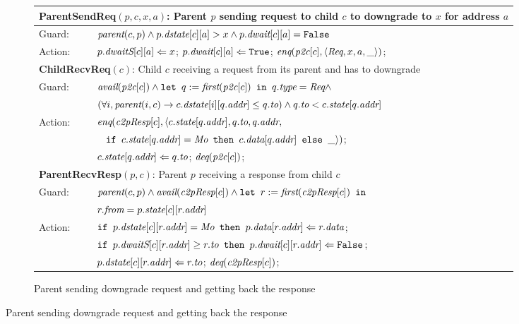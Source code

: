 \begin{figure}
\begin{subfigure}{\textwidth}
\centering
\begin{tabular}{|ll|}
\hline
\multicolumn{2}{|l|}{\textbf{ParentSendReq}$(p, c, x, a)$: Parent $p$ sending request to child $c$ to downgrade to $x$ for address $a$}\\
\hline
Guard: & $\textit{parent}(c,p) \wedge p.\textit{dstate}[c][a] > x \wedge p.\textit{dwait}[c][a] = \texttt{False}$\\
\hline
Action: & $p.\textit{dwaitS}[c][a] \Leftarrow x$; $p.\textit{dwait}[c][a] \Leftarrow \texttt{True}$; $\textit{enq}(\textit{p2c}[c], \langle \textit{Req}, x, a, \_ \rangle)$;\\
\hline
\hline
\multicolumn{2}{|p{\textwidth}|}{\textbf{ChildRecvReq}$(c)$: Child $c$ receiving a request from its parent and has to downgrade}\\
\hline
Guard: & 
$\textit{avail}(\textit{p2c}[c]) \wedge \texttt{let } q := \textit{first}(\textit{p2c}[c]) \texttt{ in } q.\textit{type} = \textit{Req} \wedge$ \\
& $(\forall i, \textit{parent}(i, c) \rightarrow c.\textit{dstate}[i][q.\textit{addr}] \le q.\textit{to}) \wedge q.\textit{to} < c.\textit{state}[q.\textit{addr}]$\\
\hline
Action: & $\textit{enq}(\textit{c2pResp}[c], \langle c.\textit{state}[q.\textit{addr}], q.\textit{to}, q.\textit{addr},$\\
& $\;\;\;%
\myif c.\state[q.\addr] = \Mo \mythen c.\data[q.\addr] \myelse \_\rangle)$;\\
& $c.\textit{state}[q.\textit{addr}] \Leftarrow q.\textit{to}$; $\textit{deq}(\textit{p2c}[c])$;\\
\hline
\hline
\multicolumn{2}{|l|}{\textbf{ParentRecvResp}$(p, c)$: Parent $p$ receiving a response from child $c$}\\
\hline
Guard: & 
$\textit{parent}(c,p) \wedge \textit{avail}(\textit{c2pResp}[c]) \wedge \texttt{let } r := \textit{first}(\textit{c2pResp}[c]) \texttt{ in }$\\
& $r.\textit{from} = p.\textit{state}[c][r.\textit{addr}]$\\
\hline
Action: & $\texttt{if } p.\textit{dstate}[c][r.\textit{addr}] = \textit{Mo} \texttt{ then } p.\textit{data}[r.\textit{addr}] \Leftarrow r.\textit{data}$;\\
&$\texttt{if } p.\textit{dwaitS}[c][r.\textit{addr}] \ge r.\textit{to} \texttt{ then } p.\textit{dwait}[c][r.\textit{addr}] \Leftarrow \texttt{False} $;\\
& $p.\textit{dstate}[c][r.\textit{addr}] \Leftarrow r.\textit{to}$; $\textit{deq}(\textit{c2pResp}[c])$;\\
\hline
\end{tabular}
\caption{Parent sending downgrade request and getting back the response}
\label{parentside}
\end{subfigure}


\end{figure}
